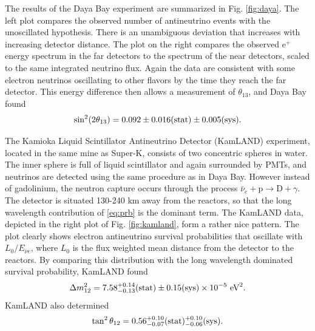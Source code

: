 The results of the Daya Bay experiment are summarized in Fig. \ref{fig:daya}. 
The left plot compares the observed number of antineutrino events with the
unoscillated hypothesis. There is an unambiguous deviation
that increases with increasing detector distance.
The plot on the right compares the observed e$^+$ energy spectrum in the far
detectors to the spectrum of the near detectors, scaled to the same integrated
neutrino flux. Again the data are consistent with some electron neutrinos
oscillating to other flavors by the time they reach the far detector.
This energy difference then allows a measurement of $\theta_{13}$, and Daya Bay
found \cite{an_observation_2012}
\begin{equation}
  \sin^2(2\theta_{13})=0.092\pm0.016({\rm stat})\pm0.005({\rm sys}).
\end{equation}

The Kamioka Liquid Scintillator Antineutrino Detector (KamLAND) experiment,
located in the same mine as Super-K, consists of two concentric spheres in
water. The inner sphere is full of liquid scintillator and again surrounded by
PMTs, and neutrinos are detected using the same procedure as in Daya Bay.
However instead of gadolinium, the neutron capture occurs through the
process $\bar{\nu}_e+\text{p}\to\text{D}+\gamma$. The detector is situated
130-240 km away from the reactors, so that the long wavelength contribution of
\eqref{eq:prb} is the dominant term. The KamLAND data, depicted in the right
plot of Fig. \ref{fig:kamland}, form a rather nice pattern. 
The plot clearly shows electron
antineutrino survival probabilities that oscillate with $L_0/E_{\bar{\nu}e}$,
where $L_0$ is the flux weighted mean distance from the detector to the
reactors. By comparing this distribution with the long wavelength dominated
survival probability, KamLAND found \cite{abe_precision_2008}
\begin{equation}
  \Delta m_{12}^2=7.58^{+0.14}_{-0.13}({\rm stat})
        \pm0.15({\rm sys})\times10^{-5}~\text{eV}^2.
\end{equation}
KamLAND also determined
\begin{equation}
  \tan^2\theta_{12}=0.56^{+0.10}_{-0.07}({\rm stat})^{+0.10}_{-0.06}({\rm sys}).
\end{equation}

